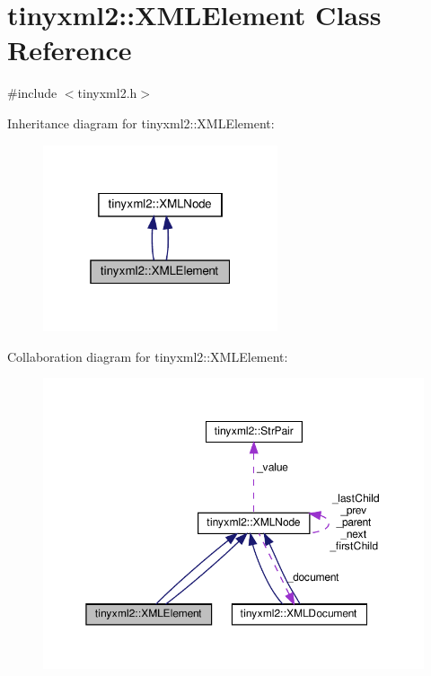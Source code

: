 \hypertarget{classtinyxml2_1_1XMLElement}{}\section{tinyxml2\+:\+:X\+M\+L\+Element Class Reference}
\label{classtinyxml2_1_1XMLElement}


{\ttfamily \#include $<$tinyxml2.\+h$>$}



Inheritance diagram for tinyxml2\+:\+:X\+M\+L\+Element\+:
\nopagebreak
\begin{figure}[H]
\begin{center}
\leavevmode
\includegraphics[width=196pt]{classtinyxml2_1_1XMLElement__inherit__graph}
\end{center}
\end{figure}


Collaboration diagram for tinyxml2\+:\+:X\+M\+L\+Element\+:
\nopagebreak
\begin{figure}[H]
\begin{center}
\leavevmode
\includegraphics[width=350pt]{classtinyxml2_1_1XMLElement__coll__graph}
\end{center}
\end{figure}

